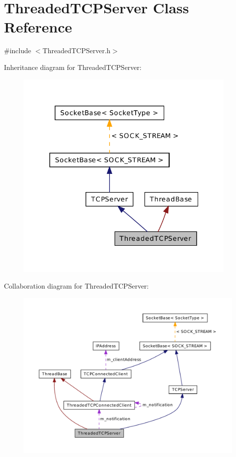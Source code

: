 \hypertarget{class_threaded_t_c_p_server}{\section{Threaded\-T\-C\-P\-Server Class Reference}
\label{class_threaded_t_c_p_server}
}


{\ttfamily \#include $<$Threaded\-T\-C\-P\-Server.\-h$>$}



Inheritance diagram for Threaded\-T\-C\-P\-Server\-:\nopagebreak
\begin{figure}[H]
\begin{center}
\leavevmode
\includegraphics[width=305pt]{class_threaded_t_c_p_server__inherit__graph}
\end{center}
\end{figure}


Collaboration diagram for Threaded\-T\-C\-P\-Server\-:\nopagebreak
\begin{figure}[H]
\begin{center}
\leavevmode
\includegraphics[width=350pt]{class_threaded_t_c_p_server__coll__graph}
\end{center}
\end{figure}
